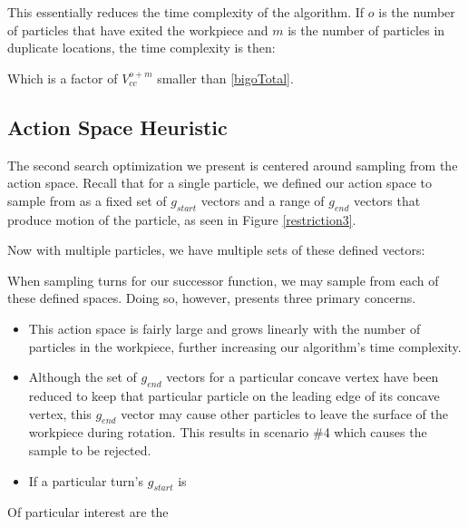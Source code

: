 This essentially reduces the time complexity of the algorithm. If $o$ is the number of particles that have exited the workpiece and $m$ is the number of particles in duplicate locations, the time complexity is then:

 {
  \label{eq:bigoTotalWithHeuristic}
}

Which is a factor of $V_{cc}^{o + m}$ smaller than \eqref{bigoTotal}.

\subsection{Action Space Heuristic}

The second search optimization we present is centered around sampling from the action space. Recall that for a single particle, we defined our action space to sample from as a fixed set of $g_{start}$ vectors and a range of $g_{end}$ vectors that produce motion of the particle, as seen in Figure \ref{restriction3}.

Now with multiple particles, we have multiple sets of these defined vectors:


When sampling turns for our successor function, we may sample from each of these defined spaces. Doing so, however, presents three primary concerns.

\begin{itemize}
\item This action space is fairly large and grows linearly with the number of particles in the workpiece, further increasing our algorithm's time complexity.
\item Although the set of $g_{end}$ vectors for a particular concave vertex have been reduced to keep that particular particle on the leading edge of its concave vertex, this $g_{end}$ vector may cause other particles to leave the surface of the workpiece during rotation. This results in scenario \#4 which causes the sample to be rejected.
\item If a particular turn's $g_{start}$ is
\end{itemize}

Of particular interest are the

